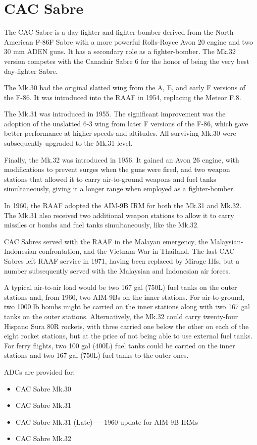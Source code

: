 \section*{CAC Sabre}

The CAC Sabre is a day fighter and fighter-bomber derived from the North American F-86F Sabre with a more powerful Rolls-Royce Avon 20 engine and two 30 mm ADEN guns. It has a secondary role as a fighter-bomber. The Mk.32 version competes with the Canadair Sabre 6 for the honor of being the very best day-fighter Sabre.

The Mk.30 had the original slatted wing from the A, E, and early F versions of the F-86. It was introduced into the RAAF in 1954, replacing the Meteor F.8.

The Mk.31 was introduced in 1955. The significant improvement was the adoption of the unslatted 6-3 wing from later F versions of the F-86, which gave better performance at higher speeds and altitudes. All surviving Mk.30 were subsequently upgraded to the Mk.31 level. 

Finally, the Mk.32 was introduced in 1956. It gained an Avon 26 engine, with modifications to prevent surges when the guns were fired, and two weapon stations that allowed it to carry air-to-ground weapons and fuel tanks simultaneously, giving it a longer range when employed as a fighter-bomber.

In 1960, the RAAF adopted the AIM-9B IRM for both the Mk.31 and Mk.32. The Mk.31 also received two additional weapon stations to allow it to carry missiles or bombs and fuel tanks simultaneously, like the Mk.32.

CAC Sabres served with the RAAF in the Malayan emergency, the Malaysian-Indonesian confrontation, and the Vietnam War in Thailand. The last CAC Sabres left RAAF service in 1971, having been replaced by Mirage IIIs, but a number subsequently served with the Malaysian and Indonesian air forces.

A typical air-to-air load would be two 167 gal (750L) fuel tanks on the outer stations and, from 1960, two AIM-9Bs on the inner stations. For air-to-ground, two 1000 lb bombs might be carried on the inner stations along with two 167 gal tanks on the outer stations. Alternatively, the Mk.32 could carry twenty-four Hispano Sura 80R rockets, with three carried one below the other on each of the eight rocket stations, but at the price of not being able to use external fuel tanks. For ferry flights, two 100 gal (400L) fuel tanks could be carried on the inner stations and two 167 gal (750L) fuel tanks to the outer ones.

ADCs are provided for:
\begin{itemize}
\item CAC Sabre Mk.30
\item CAC Sabre Mk.31
\item CAC Sabre Mk.31 (Late) –– 1960 update for AIM-9B IRMs
\item CAC Sabre Mk.32
\end{itemize}
